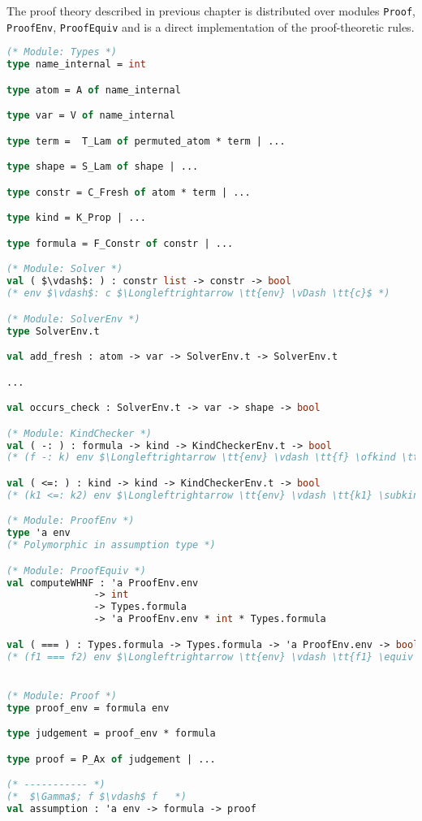 \documentclass[english, mgr]{iithesis}
\renewcommand{\tt}[1]{\texttt{\small{#1}}}
\begin{document}
The proof theory described in previous chapter is distributed over modules
\tt{Proof}, \tt{ProofEnv}, \tt{ProofEquiv} and is a direct implementation of the proof-theoretic rules.
\begin{lstlisting}[mathescape, language=OCaml]
(* Module: Types *)
type name_internal = int

type atom = A of name_internal

type var = V of name_internal

type term =  T_Lam of permuted_atom * term | ...

type shape = S_Lam of shape | ...

type constr = C_Fresh of atom * term | ...

type kind = K_Prop | ...

type formula = F_Constr of constr | ...

(* Module: Solver *)
val ( $\vdash$: ) : constr list -> constr -> bool
(* env $\vdash$: c $\Longleftrightarrow \tt{env} \vDash \tt{c}$ *)

(* Module: SolverEnv *)
type SolverEnv.t

val add_fresh : atom -> var -> SolverEnv.t -> SolverEnv.t

...

val occurs_check : SolverEnv.t -> var -> shape -> bool

(* Module: KindChecker *)
val ( -: ) : formula -> kind -> KindCheckerEnv.t -> bool
(* (f -: k) env $\Longleftrightarrow \tt{env} \vdash \tt{f} \ofkind \tt{k}$ *)

val ( <=: ) : kind -> kind -> KindCheckerEnv.t -> bool
(* (k1 <=: k2) env $\Longleftrightarrow \tt{env} \vdash \tt{k1} \subkind \tt{k2}$ *)

(* Module: ProofEnv *)
type 'a env
(* Polymorphic in assumption type *)

(* Module: ProofEquiv *)
val computeWHNF : 'a ProofEnv.env
               -> int
               -> Types.formula
               -> 'a ProofEnv.env * int * Types.formula

val ( === ) : Types.formula -> Types.formula -> 'a ProofEnv.env -> bool
(* (f1 === f2) env $\Longleftrightarrow \tt{env} \vdash \tt{f1} \equiv \tt{f2}$ *)


(* Module: Proof *)
type proof_env = formula env

type judgement = proof_env * formula

type proof = P_Ax of judgement | ...

(* ----------- *)
(*  $\Gamma$; f $\vdash$ f   *)
val assumption : 'a env -> formula -> proof


\end{lstlisting}
\end{document}
